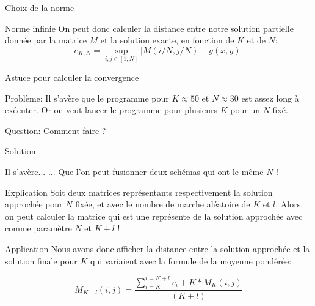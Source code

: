 \documentclass{beamer}
\begin{document}
\begin{frame}{Choix de la norme}
    \begin{block}{Norme infinie}
        On peut donc calculer la distance entre notre solution partielle donnée par la matrice $M$
        et la solution exacte, en fonction de $K$ et de $N$:
        \[
            e_{K, N} = \sup_{i,j \in [1;N]}{| M(i/N,j/N) - g(x,y)|}
        \]
    \end{block}
\end{frame}

\begin{frame}{Astuce pour calculer la convergence}
    \begin{block}{Problème:}
        Il s'avère que le programme pour $K \approx 50$ et $N\approx 30$ est assez long à exécuter.
        Or on veut lancer le programme pour plusieurs $K$ pour un $N$ fixé.
    \end{block}

    \begin{alertblock}{Question:}
        \centering \huge{Comment faire ?}
    \end{alertblock}
\end{frame}

\begin{frame}{Solution}
    \begin{block}{Il s'avère...}
        ... Que l'on peut fusionner deux schémas qui ont le même $N$ !
    \end{block}
    \begin{block}{Explication}
        Soit deux matrices représentants respectivement la solution approchée pour $N$ fixée, et avec le nombre de marche aléatoire de $K$ et $l$.
        Alors, on peut calculer la matrice qui est une représente de la solution approchée avec comme paramètre $N$ et $K+l$ !
    \end{block}
\end{frame}

\begin{frame}{Application}
    Nous avons donc afficher la distance entre la solution approchée et la solution finale pour 
    $K$ qui variaient avec la formule de la moyenne pondérée:

    \[
        M_{K+l}(i,j) = \frac{ \sum_{i=K}^{i=K+l} v_i + K*M_{K}(i,j) }{ (K + l) }
    \]
\end{frame}
\end{document}
